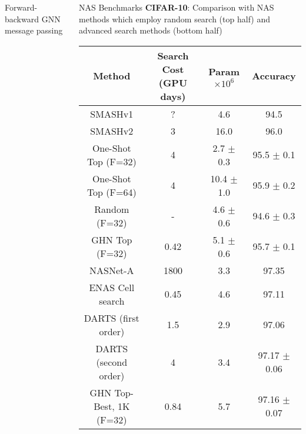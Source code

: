 \documentclass[final,t]{beamer}
\begin{document}
\begin{frame}{}
\begin{columns}[t]
\begin{column}{.32\linewidth}
\begin{exampleblock}{Forward-backward GNN message passing}
    \end{exampleblock}
    
\end{column}
\vspace{0pt}





\begin{column}{.32\linewidth}
    \vskip -0.5cm

    \begin{exampleblock}{NAS Benchmarks}
    \textbf{CIFAR-10}: Comparison with NAS methods which employ random search (top half) and advanced search methods (bottom half)
  	\begin{table}[t]
\label{table:Results1}
\footnotesize
\begin{center}
\begin{tabular}{ c c c c } 
Method & Search Cost (GPU days) & Param $\times 10^6$ & Accuracy   \\ 
\hline
SMASHv1 \citep{brock2017smash} &? & 4.6 & 94.5 \\
SMASHv2 \citep{brock2017smash} & 3 & 16.0 & 96.0\\
One-Shot Top (F=32) \citep{bender2018understanding} & 4  & 2.7 $\pm$ 0.3 & 95.5 $\pm$ 0.1\\
One-Shot Top (F=64) \citep{bender2018understanding} & 4 & 10.4 $\pm$ 1.0 & 95.9 $\pm$ 0.2\\
\hline
\hline
Random (F=32) & - & 4.6 $\pm$ 0.6 & 94.6 $\pm$ 0.3\\ 
GHN Top (F=32) &  0.42  & 5.1 $\pm$ 0.6 & 95.7 $\pm$ 0.1\\ 
\hline\hline\hline
NASNet-A  \citep{zoph2017learning} & 1800 & 3.3 & 97.35 \\
ENAS Cell search  \citep{pham2018efficient} & 0.45  & 4.6 & 97.11 \\
DARTS (first order)  \citep{liu2018darts} &  1.5  & 2.9  & 97.06  \\
DARTS (second order) \citep{liu2018darts} & 4  & 3.4 & 97.17 $\pm$ 0.06\\
\hline
\hline
GHN Top-Best, 1K (F=32) & 0.84  & 5.7 & 97.16 $\pm$ 0.07 \\
\end{tabular}
\end{center}
\end{table}


\end{exampleblock}
\end{column}
\end{columns}
\end{frame}
\end{document}

